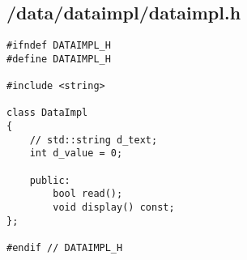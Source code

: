 \documentclass{article}
\begin{document}
\subsection*{/data/dataimpl/dataimpl.h}
\begin{verbatim}
#ifndef DATAIMPL_H
#define DATAIMPL_H

#include <string>

class DataImpl 
{
    // std::string d_text;
    int d_value = 0;

    public:
        bool read();
        void display() const; 
};

#endif // DATAIMPL_H

\end{verbatim}
\end{document}

